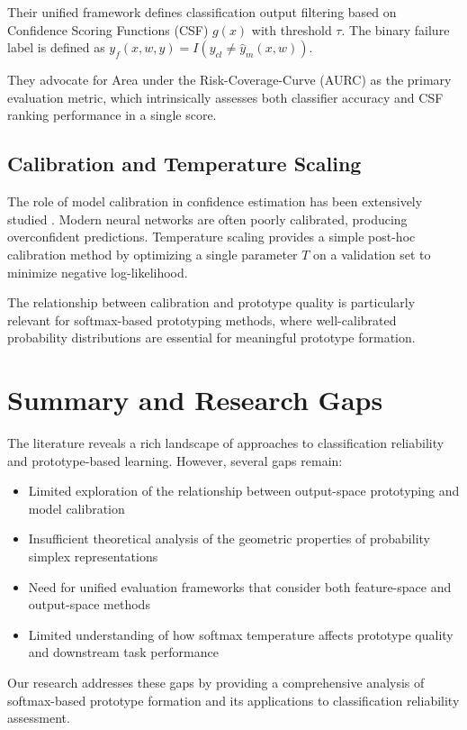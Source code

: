 Their unified framework defines classification output filtering based on Confidence Scoring Functions (CSF) $g(x)$ with threshold $\tau$. The binary failure label is defined as $y_f(x,w,y) = I(y_{cl} \neq \hat{y}_m(x,w))$.

They advocate for Area under the Risk-Coverage-Curve (AURC) as the primary evaluation metric, which intrinsically assesses both classifier accuracy and CSF ranking performance in a single score.

\subsection{Calibration and Temperature Scaling}

The role of model calibration in confidence estimation has been extensively studied \cite{Guo2017}. Modern neural networks are often poorly calibrated, producing overconfident predictions. Temperature scaling provides a simple post-hoc calibration method by optimizing a single parameter $T$ on a validation set to minimize negative log-likelihood.

The relationship between calibration and prototype quality is particularly relevant for softmax-based prototyping methods, where well-calibrated probability distributions are essential for meaningful prototype formation.

\section{Summary and Research Gaps}

The literature reveals a rich landscape of approaches to classification reliability and prototype-based learning. However, several gaps remain:

\begin{itemize}
    \item Limited exploration of the relationship between output-space prototyping and model calibration
    \item Insufficient theoretical analysis of the geometric properties of probability simplex representations
    \item Need for unified evaluation frameworks that consider both feature-space and output-space methods
    \item Limited understanding of how softmax temperature affects prototype quality and downstream task performance
\end{itemize}

Our research addresses these gaps by providing a comprehensive analysis of softmax-based prototype formation and its applications to classification reliability assessment.
